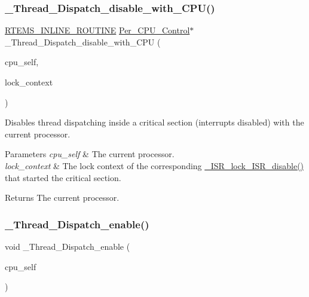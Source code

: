 \subsubsection{\texorpdfstring{\_Thread\_Dispatch\_disable\_with\_CPU()}{\_Thread\_Dispatch\_disable\_with\_CPU()}}
{\footnotesize\ttfamily \mbox{\hyperlink{group__RTEMSScoreBaseDefs_gac216239df231d5dbd15e3520b0b9313f}{R\+T\+E\+M\+S\+\_\+\+I\+N\+L\+I\+N\+E\+\_\+\+R\+O\+U\+T\+I\+NE}} \mbox{\hyperlink{structPer__CPU__Control}{Per\+\_\+\+C\+P\+U\+\_\+\+Control}}$\ast$ \+\_\+\+Thread\+\_\+\+Dispatch\+\_\+disable\+\_\+with\+\_\+\+C\+PU (\begin{DoxyParamCaption}\item[{\mbox{\hyperlink{structPer__CPU__Control}{Per\+\_\+\+C\+P\+U\+\_\+\+Control}} $\ast$}]{cpu\+\_\+self,  }\item[{const \mbox{\hyperlink{structISR__lock__Context}{I\+S\+R\+\_\+lock\+\_\+\+Context}} $\ast$}]{lock\+\_\+context }\end{DoxyParamCaption})}



Disables thread dispatching inside a critical section (interrupts disabled) with the current processor. 


\begin{DoxyParams}{Parameters}
{\em cpu\+\_\+self} & The current processor. \\
\hline
{\em lock\+\_\+context} & The lock context of the corresponding \mbox{\hyperlink{group__RTEMSScoreISRLocks_ga36d91ceed1df931ce6291d7bc9e60573}{\+\_\+\+I\+S\+R\+\_\+lock\+\_\+\+I\+S\+R\+\_\+disable()}} that started the critical section.\\
\hline
\end{DoxyParams}
\begin{DoxyReturn}{Returns}
The current processor. 
\end{DoxyReturn}
\mbox{\label{group__RTEMSScoreThread_gab0c773b97624be1dc304a2d3d038f19a}} 
\subsubsection{\texorpdfstring{\_Thread\_Dispatch\_enable()}{\_Thread\_Dispatch\_enable()}}
{\footnotesize\ttfamily void \+\_\+\+Thread\+\_\+\+Dispatch\+\_\+enable (\begin{DoxyParamCaption}\item[{\mbox{\hyperlink{structPer__CPU__Control}{Per\+\_\+\+C\+P\+U\+\_\+\+Control}} $\ast$}]{cpu\+\_\+self }\end{DoxyParamCaption})}



